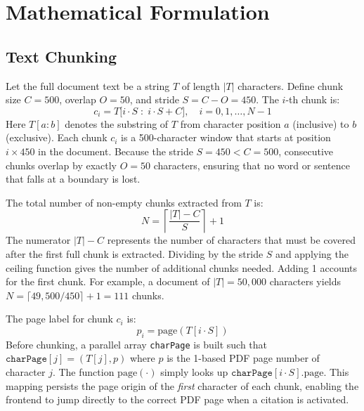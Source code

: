 \documentclass[conference]{IEEEtran}
\begin{document}
\section{Mathematical Formulation}
\label{sec:math}

\subsection{Text Chunking}
Let the full document text be a string $T$ of length $|T|$ characters.
Define chunk size $C=500$, overlap $O=50$, and stride $S=C-O=450$.
The $i$-th chunk is:
\begin{equation}
  c_i = T\bigl[i{\cdot}S \;:\; i{\cdot}S + C\bigr],
  \quad i = 0,1,\ldots,N-1
  \label{eq:chunk}
\end{equation}
Here $T[a:b]$ denotes the substring of $T$ from character
position $a$ (inclusive) to $b$ (exclusive).
Each chunk $c_i$ is a 500-character window that starts at position
$i \times 450$ in the document.
Because the stride $S=450 < C=500$, consecutive chunks overlap by
exactly $O=50$ characters, ensuring that no word or sentence that falls
at a boundary is lost.

The total number of non-empty chunks extracted from $T$ is:
\begin{equation}
  N = \left\lceil \frac{|T| - C}{S} \right\rceil + 1
  \label{eq:nchunks}
\end{equation}
The numerator $|T|-C$ represents the number of characters that must be
covered after the first full chunk is extracted.
Dividing by the stride $S$ and applying the ceiling function gives the
number of additional chunks needed.
Adding 1 accounts for the first chunk.
For example, a document of $|T|=50{,}000$ characters yields
$N = \lceil 49{,}500 / 450 \rceil + 1 = 111$ chunks.

The page label for chunk $c_i$ is:
\begin{equation}
  p_i = \mathrm{page}\!\left(T[i{\cdot}S]\right)
  \label{eq:pagelabel}
\end{equation}
Before chunking, a parallel array \texttt{charPage} is built such that
$\texttt{charPage}[j] = (T[j], p)$ where $p$ is the 1-based PDF page
number of character $j$.
The function $\mathrm{page}(\cdot)$ simply looks up
$\texttt{charPage}[i \cdot S].\mathrm{page}$.
This mapping persists the page origin of the \emph{first} character of
each chunk, enabling the frontend to jump directly to the correct PDF
page when a citation is activated.
\end{document}
